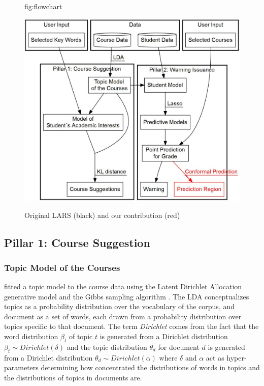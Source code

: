 \documentclass[pmlr]{jmlr}%
\begin{document}
\begin{figure}[htbp]
	\floatconts
	{fig:flowchart}
	{\caption{Original LARS (black) and our contribution (red)}}
	{\includegraphics[width=0.66\linewidth]{figures/flowchart}}
\end{figure}

\subsection{Pillar 1: Course Suggestion}

\subsubsection{Topic Model of the Courses}
\label{sec:tm}

\citet{Morsomme.2019} fitted a topic model to the course data using the Latent Dirichlet Allocation generative model \citep{Blei.2003} and the Gibbs sampling algorithm \citep{Phan.2008}. The LDA conceptualizes topics as a probability distribution over the vocabulary of the corpus, and document as a set of words, each drawn from a probability distribution over topics specific to that document. The term \textit{Dirichlet} comes from the fact that the word distribution $\beta_{t}$ of topic $t$ is generated from a Dirichlet distribution $\beta_{t} \sim Dirichlet(\delta)$ and the topic distribution $\theta_{d}$ for document $d$ is generated from a Dirichlet distribution $\theta_{d} \sim Dirichlet(\alpha)$ where $\delta$ and $\alpha$ act as hyper-parameters determining how concentrated the distributions of words in topics and the distributions of topics in documents are.
\end{document}
